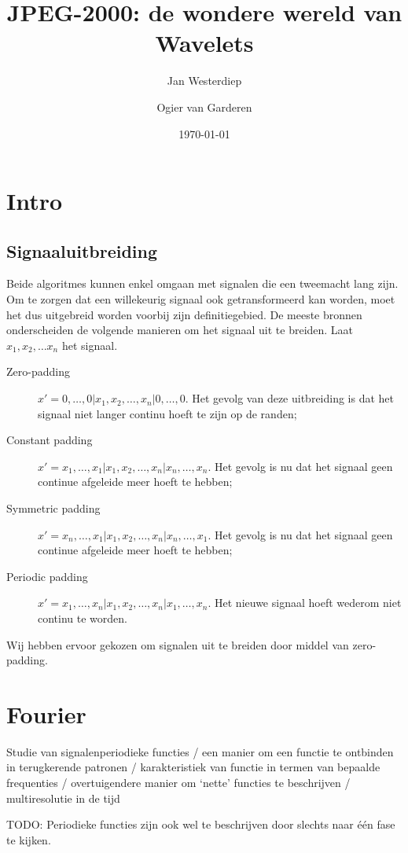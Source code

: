 \documentclass[11pt]{report}
\title{JPEG-2000: de wondere wereld van Wavelets}
\date{\today}
\author{Jan Westerdiep \and Ogier van Garderen}
\theoremstyle{plain}
\theoremstyle{remark}
\begin{document}
\maketitle
\tableofcontents 
\newpage
\chapter{Intro}
\section{Signaaluitbreiding}
\label{signaal}
Beide algoritmes kunnen enkel omgaan met signalen die een tweemacht lang zijn. Om te zorgen dat een willekeurig signaal ook getransformeerd kan worden, moet het dus uitgebreid worden voorbij zijn definitiegebied. De meeste bronnen onderscheiden de volgende manieren om het signaal uit te breiden. Laat $x_1, x_2, \ldots x_n$ het signaal.
\begin{description}
	\item[Zero-padding] $x' = 0, \ldots, 0| x_1, x_2, \ldots, x_n| 0, \ldots, 0$. Het gevolg van deze uitbreiding is dat het signaal niet langer continu hoeft te zijn op de randen;
	\item[Constant padding] $x' = x_1, \ldots, x_1| x_1, x_2, \ldots, x_n| x_n, \ldots, x_n$. Het gevolg is nu dat het signaal geen continue afgeleide meer hoeft te hebben; 
	\item[Symmetric padding] $x' = x_n, \ldots, x_1| x_1, x_2, \ldots, x_n| x_n, \ldots, x_1$. Het gevolg is nu dat het signaal geen continue afgeleide meer hoeft te hebben; 
	\item[Periodic padding] $x' = x_1, \ldots, x_n| x_1, x_2, \ldots, x_n| x_1, \ldots, x_n$. Het nieuwe signaal hoeft wederom niet continu te worden.
\end{description}
Wij hebben ervoor gekozen om signalen uit te breiden door middel van zero-padding.


\iffalse
\chapter{Fourier}

Studie van signalenperiodieke functies / 
een manier om een functie te ontbinden in terugkerende patronen /
karakteristiek van functie in termen van bepaalde frequenties /
overtuigendere manier om `nette' functies te beschrijven /
multiresolutie in de tijd

TODO: Periodieke functies zijn ook wel te beschrijven door slechts naar \'e\'en fase te kijken.
\end{document}
